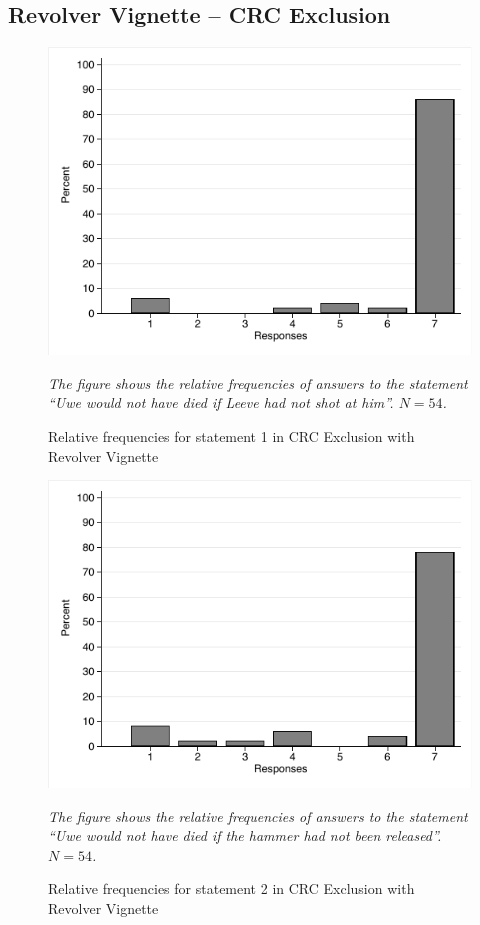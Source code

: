 \documentclass[egregdoesnotlikesansseriftitles,12pt]{scrartcl}
\begin{document}
\subsection{Revolver Vignette -- CRC Exclusion}
\begin{figure}[H]
   \centering
   \includegraphics[scale=0.8]{figures/rev_crc_hist_1.pdf}
   \begin{minipage}{0.9\linewidth}
   \footnotesize
   \emph{The figure shows the relative frequencies of answers to the statement ``Uwe would not have died if Leeve had not shot at him''. $N=54$.}
   \end{minipage}
   \caption{Relative frequencies for statement 1 in CRC Exclusion with Revolver Vignette}
   \label{fig:rev_crc_hist_1}
\end{figure}

\begin{figure}[H]
   \centering
   \includegraphics[scale=0.8]{figures/rev_crc_hist_2.pdf}
   \begin{minipage}{0.9\linewidth}
   \footnotesize
   \emph{The figure shows the relative frequencies of answers to the statement ``Uwe would not have died if the hammer had not been released''. $N=54$.}
   \end{minipage}
   \caption{Relative frequencies for statement 2 in CRC Exclusion with Revolver Vignette}
   \label{fig:rev_crc_hist_2}
\end{figure}
\end{document}
